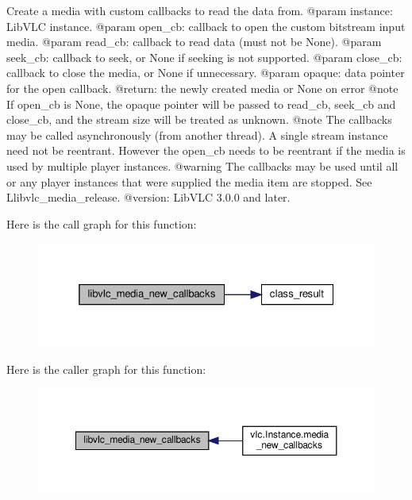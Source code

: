 \begin{DoxyVerb}Create a media with custom callbacks to read the data from.
@param instance: LibVLC instance.
@param open_cb: callback to open the custom bitstream input media.
@param read_cb: callback to read data (must not be None).
@param seek_cb: callback to seek, or None if seeking is not supported.
@param close_cb: callback to close the media, or None if unnecessary.
@param opaque: data pointer for the open callback.
@return: the newly created media or None on error @note If open_cb is None, the opaque pointer will be passed to read_cb, seek_cb and close_cb, and the stream size will be treated as unknown. @note The callbacks may be called asynchronously (from another thread). A single stream instance need not be reentrant. However the open_cb needs to be reentrant if the media is used by multiple player instances. @warning The callbacks may be used until all or any player instances that were supplied the media item are stopped. See L{libvlc_media_release}.
@version: LibVLC 3.0.0 and later.
\end{DoxyVerb}
 Here is the call graph for this function\+:
\nopagebreak
\begin{figure}[H]
\begin{center}
\leavevmode
\includegraphics[width=325pt]{namespacevlc_a06f233cba42468c4eb2128bef3bd44c9_cgraph}
\end{center}
\end{figure}
Here is the caller graph for this function\+:
\nopagebreak
\begin{figure}[H]
\begin{center}
\leavevmode
\includegraphics[width=350pt]{namespacevlc_a06f233cba42468c4eb2128bef3bd44c9_icgraph}
\end{center}
\end{figure}
\mbox{\label{namespacevlc_ab47a8f7f91485525472a13de0e66b7ff}} 
